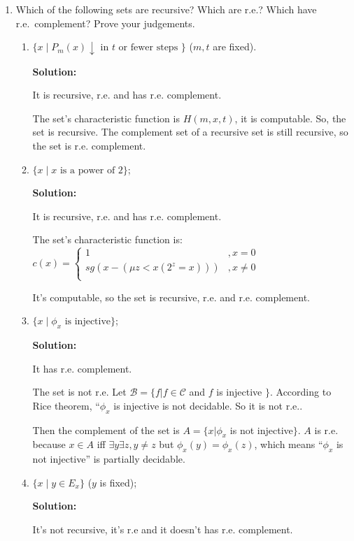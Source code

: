 \documentclass[12pt,a4paper]{article}
\theoremstyle{definition}
\numberwithin{equation}{section}
\numberwithin{figure}{section}
\begin{document}
\begin{enumerate}
\item Which of the following sets are recursive? Which are r.e.? Which have r.e.~complement? Prove your judgements.
  \begin{enumerate}
  \item $\{x \mid P_m(x) \downarrow \mbox{ in } t \mbox{ or fewer steps }\}$ ($m,t$ are fixed).
  
  \textbf{Solution:}
  
  It is recursive, r.e. and has r.e. complement.
  
    The set's characteristic function is $H(m,x,t)$, it is computable. So, the set is recursive. The complement set of a recursive set is still recursive, so the set is r.e. complement.
  
  \item $\{x \mid x \mbox{ is a power of 2}\}$;
    
  \textbf{Solution:}
  
  It is recursive, r.e. and has r.e. complement.
  
  The set's characteristic function is:
$c(x)=\begin{cases}1 &,x=0 \\ sg(x-(\mu z<x(2^z=x))) &,x \neq 0 \\ \end{cases}$

It's computable, so the set is recursive, r.e. and r.e. complement.
  
  \item $\{x \mid \phi_x \mbox{ is injective}\}$;
    
  \textbf{Solution:}
  
It has r.e. complement.

The set is not r.e. Let $ \mathscr{B}=\{f|f \in \mathscr{C}$ and $f$ is injective $\}$. According to Rice theorem, “$\phi_x$ is injective is not decidable. So it is not r.e..

Then the complement of the set is $A = \{x | \phi_x$ is not injective$\}$. $A$ is r.e. because $x \in A$ iff $\exists y \exists z, y \neq z$ but $\phi_x(y) = \phi_x(z)$, which means “$\phi_x$ is not injective” is partially decidable.
  
  
  
  \item $\{x \mid y\in E_x\}$ ($y$ is fixed);
    
  \textbf{Solution:}
  
  It's not recursive, it's r.e and it doesn't has r.e. complement.
  

\end{enumerate}
\end{enumerate}
\end{document}
